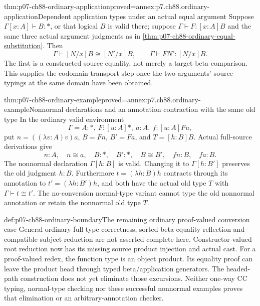 \begin{hbtheorem}{thm:p07-ch88-ordinary-application}{proved=annex:p7.ch88.ordinary-application}{Dependent application types under an actual equal argument}
Suppose \(\Gamma[x:A]\vdash B:\ast\), or that logical \(B\)
is valid there; suppose \(\Gamma\vdash F:[x:A]B\) and the same
three actual argument judgments as in
\cref{thm:p07-ch88-ordinary-equal-substitution}. Then
\[
 \Gamma\vdash[N/x]B\cong[N'/x]B,\qquad
 \Gamma\vdash FN':[N/x]B.
\]
The first is a constructed source equality, not merely a target beta
comparison. This supplies the codomain-transport step once the two
arguments' source typings at the same domain have been obtained.
\end{hbtheorem}

\begin{hbtheorem}{thm:p07-ch88-ordinary-example}{proved=annex:p7.ch88.ordinary-example}{Nonnormal declarations and an annotation contraction with the same old type}
In the ordinary valid environment
\[
 \Gamma=A:\ast,\ F:[u:A]\ast,\ a:A,\ f:[u:A]Fu,
\]
put \(n=((\lambda v:A)v)a\), \(B=Fn\), \(B'=Fa\), and
\(T=[h:B]B\). Actual full-source derivations give
\[
 n:A,\quad n\cong a,\quad B:\ast,\quad B':\ast,
 \quad B\cong B',\quad fn:B,\quad fa:B.
\]
The nonnormal declaration \(\Gamma[h:B]\) is valid. Changing it
to \(\Gamma[h:B']\) preserves the old judgment \(h:B\).
Furthermore \(t=(\lambda h:B)h\) contracts through its annotation
to \(t'=(\lambda h:B')h\), and both have the actual old type \(T\)
with \(\Gamma\vdash t\cong t'\).
The no-conversion normal-type variant cannot type the old nonnormal
annotation or retain the nonnormal old type \(T\).
\end{hbtheorem}

\begin{proofboundary}{def:p07-ch88-ordinary-boundary}{The remaining ordinary proof-valued conversion case}
General ordinary-full type correctness, sorted-beta equality reflection
and compatible subject reduction are not asserted complete here.
Constructor-valued root reduction now has its missing source product
injection and actual cast. For a proof-valued redex, the function type
is an object product. Its equality proof can leave the product head
through typed beta/application generators. The headed-path construction
does not yet eliminate those excursions. Neither one-way CC typing,
normal-type checking nor these successful nonnormal examples proves
that elimination or an arbitrary-annotation checker.
\end{proofboundary}
